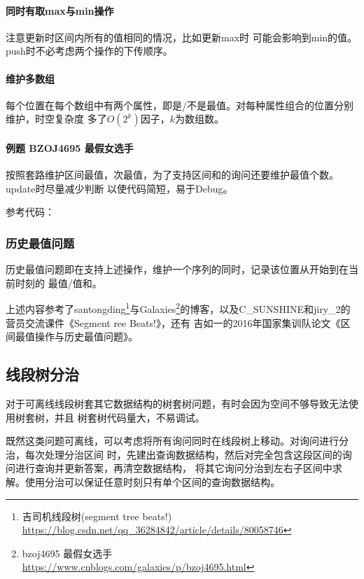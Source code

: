 \paragraph{同时有取max与min操作}注意更新时区间内所有的值相同的情况，比如更新max时
可能会影响到min的值。push时不必考虑两个操作的下传顺序。

\paragraph{维护多数组}
每个位置在每个数组中有两个属性，即是/不是最值。对每种属性组合的位置分别维护，时空复杂度
多了$O(2^k)$因子，$k$为数组数。

\paragraph{例题 BZOJ4695 最假女选手}
按照套路维护区间最值，次最值，为了支持区间和的询问还要维护最值个数。update时尽量减少判断
以使代码简短，易于Debug。

参考代码：


\subsubsection{历史最值问题}
历史最值问题即在支持上述操作，维护一个序列的同时，记录该位置从开始到在当前时刻的
最值/值和。

上述内容参考了santongding\footnote{
    吉司机线段树(segment tree beats!)\\
    \url{https://blog.csdn.net/qq\_36284842/article/details/80058746}
}与Galaxies\footnote{
    bzoj4695 最假女选手\\
    \url{https://www.cnblogs.com/galaxies/p/bzoj4695.html}
}的博客，以及C\_SUNSHINE和jiry\_2的营员交流课件《Segment ree Beats!》，还有
吉如一的2016年国家集训队论文《区间最值操作与历史最值问题》。

\subsection{线段树分治}
对于可离线线段树套其它数据结构的树套树问题，有时会因为空间不够导致无法使用树套树，并且
树套树代码量大，不易调试。

既然这类问题可离线，可以考虑将所有询问同时在线段树上移动。对询问进行分治，每次处理分治区间
时，先建出查询数据结构，然后对完全包含这段区间的询问进行查询并更新答案，再清空数据结构，
将其它询问分治到左右子区间中求解。使用分治可以保证任意时刻只有单个区间的查询数据结构。

